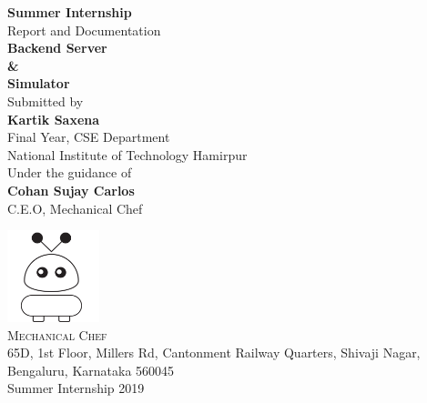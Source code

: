 \begin{titlepage}

\begin{center}

\large{ {\bf Summer Internship} \\[0.1in] Report and Documentation}\\[0.3in]

\Large \textbf {Backend Server \\ \& \\ Simulator}\\[0.7in]


       

\normalsize Submitted by \\[0.2in]
\textbf{Kartik Saxena}\\
Final Year, CSE Department \\
National Institute of Technology Hamirpur\\

\vspace{.2in}
Under the guidance of\\[0.2in]
\textbf{Cohan Sujay Carlos}\\
C.E.O, Mechanical Chef



\vspace{.3in}

\includegraphics[width=0.2\textwidth]{mechchef_logo.png}\\[0.1in]
\normalsize
\textsc{Mechanical Chef }\\
65D, 1st Floor, Millers Rd, Cantonment Railway Quarters, Shivaji Nagar, Bengaluru, Karnataka 560045 \\
\vspace{0.2cm}
Summer Internship 2019

\end{center}

\end{titlepage}
